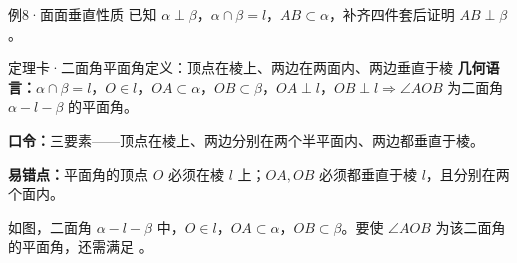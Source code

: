 \documentclass{exam-zh}
\begin{document}
\begin{eduSubQuestionItem}{例8·面面垂直性质}
已知 $\alpha\perp\beta$，$\alpha\cap\beta=l$，$AB\subset\alpha$，补齐四件套后证明 $AB\perp\beta$。\end{eduSubQuestionItem}

\begin{eduDualExplain}
  \begin{eduExplainLeft}
  \end{eduExplainLeft}

  \begin{eduExplainRight}
  \end{eduExplainRight}
\end{eduDualExplain}





\begin{eduSolutionBox}{定理卡·二面角平面角定义：顶点在棱上、两边在两面内、两边垂直于棱}
  \begingroup
  \setlength{\parskip}{2.5mm}
\textbf{几何语言：}$\alpha\cap\beta=l$，$O\in l$，$OA\subset\alpha$，$OB\subset\beta$，$OA\perp l$，$OB\perp l\Rightarrow\angle AOB$ 为二面角 $\alpha\!-\!l\!-\!\beta$ 的平面角。\par
\textbf{口令：}三要素——顶点在棱上、两边分别在两个半平面内、两边都垂直于棱。\par
\textbf{易错点：}平面角的顶点 $O$ 必须在棱 $l$ 上；$OA,OB$ 必须都垂直于棱 $l$，且分别在两个面内。\par
  \endgroup
\end{eduSolutionBox}




\begin{eduProblemBlock}[例9·二面角平面角]
如图，二面角 $\alpha\!-\!l\!-\!\beta$ 中，$O\in l$，$OA\subset\alpha$，$OB\subset\beta$。要使 $\angle AOB$ 为该二面角的平面角，还需满足 \underline{\hspace{24mm}}。

\end{eduProblemBlock}
\end{document}
